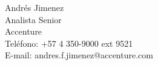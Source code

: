 \begin{resume}
 Andr\'{e}s Jimenez\\
 Analista Senior \\
 Accenture \\
 Tel\'{e}fono: +57 4 350-9000 ext 9521  \\
 E-mail: andres.f.jimenez@accenture.com 
\end{resume}

